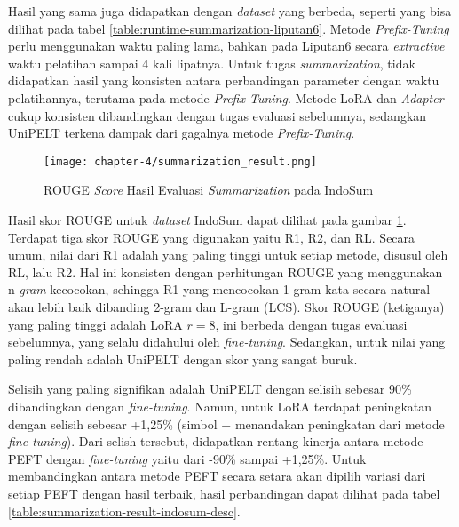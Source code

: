 Hasil yang sama juga didapatkan dengan \textit{dataset} yang berbeda, seperti yang bisa dilihat pada tabel \ref{table:runtime-summarization-liputan6}. Metode \textit{Prefix-Tuning} perlu menggunakan waktu paling lama, bahkan pada Liputan6 secara \textit{extractive} waktu pelatihan sampai 4 kali lipatnya. Untuk tugas \textit{summarization}, tidak didapatkan hasil yang konsisten antara perbandingan parameter dengan waktu pelatihannya, terutama pada metode \textit{Prefix-Tuning}. Metode LoRA dan \textit{Adapter} cukup konsisten dibandingkan dengan tugas evaluasi sebelumnya, sedangkan UniPELT terkena dampak dari gagalnya metode \textit{Prefix-Tuning}.

\begin{figure}[h]
    \centering
    \centerline{\texttt{[image: chapter-4/summarization\_result.png]}}
    \caption{ROUGE \textit{Score} Hasil Evaluasi \textit{Summarization} pada IndoSum}
    \label{fig:summarization-result-indosum}
\end{figure}

Hasil skor ROUGE untuk \textit{dataset} IndoSum dapat dilihat pada gambar \ref{fig:summarization-result-indosum}. Terdapat tiga skor ROUGE yang digunakan yaitu R1, R2, dan RL. Secara umum, nilai dari R1 adalah yang paling tinggi untuk setiap metode, disusul oleh RL, lalu R2. Hal ini konsisten dengan perhitungan ROUGE yang menggunakan n-\textit{gram} kecocokan, sehingga R1 yang mencocokan 1-gram kata secara natural akan lebih baik dibanding 2-gram dan L-gram (LCS). Skor ROUGE (ketiganya) yang paling tinggi adalah LoRA $r=8$, ini berbeda dengan tugas evaluasi sebelumnya, yang selalu didahului oleh \textit{fine-tuning}. Sedangkan, untuk nilai yang paling rendah adalah UniPELT dengan skor yang sangat buruk.

Selisih yang paling signifikan adalah UniPELT dengan selisih sebesar 90\% dibandingkan dengan \textit{fine-tuning}. Namun, untuk LoRA terdapat peningkatan dengan selisih sebesar +1,25\% (simbol + menandakan peningkatan dari metode \textit{fine-tuning}). Dari selish tersebut, didapatkan rentang kinerja antara metode PEFT dengan \textit{fine-tuning} yaitu dari -90\% sampai +1,25\%. Untuk membandingkan antara metode PEFT secara setara akan dipilih variasi dari setiap PEFT dengan hasil terbaik, hasil perbandingan dapat dilihat pada tabel \ref{table:summarization-result-indosum-desc}.

